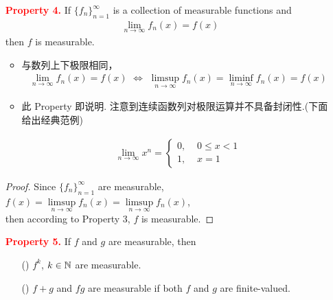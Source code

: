 \begin{enumerate}
		\newpage
		\item[\textcolor{red}{\textbf{Property 4.}}]If $\{ f_n \}_{n = 1}^{\infty}$ is a collection of measurable functions and
		\begin{align}
			\lim_{n \to \infty}{f_{n}(x)} = f(x)
		\end{align}
		then $f$ is measurable.
		
		\begin{rmk}
			\begin{itemize}
				\item 与数列上下极限相同，
				\begin{align}
					\lim_{n \to \infty}{f_{n}(x)} = f(x) \,\, \Leftrightarrow \,\, \limsup_{n \to \infty}{f_{n}(x)} = \liminf_{n \to \infty}{f_{n}(x)} = f(x)
				\end{align}
			
				\item 此 Property 即说明. 注意到连续函数列对极限运算并不具备封闭性.(下面给出经典范例)
				\begin{example}\label{ex 2.1.1}
					\begin{align}
						\lim_{n \to \infty}{x^n} = 
						\begin{cases}
							0 , \,\, &0 \leq x < 1 \\
							1 , &x = 1
						\end{cases}
					\end{align}
				\end{example}
			\end{itemize}
		\end{rmk}
	
		\vspace{2em}
		\begin{proof}
			Since $\{ f_n \}_{n = 1}^{\infty}$ are measurable, $f(x) = \underset{n \to \infty}{\limsup}{f_{n}(x)} = \underset{n \to \infty}{\limsup}{f_{n}(x)}$,\\
			then according to Property 3, $f$ is measurable.
		\end{proof}
	
		\vspace{2em}
		\item[\textcolor{red}{\textbf{Property 5.}}]If $f$ and $g$ are measurable, then
		\begin{enumerate}
			\item[(\rmnum{1})]$f^k$, $k \in \mathbb{N}$ are measurable.
			
			\item[(\rmnum{2})]$f + g$ and $fg$ are measurable if both $f$ and $g$ are finite-valued.
		\end{enumerate}
	

\end{enumerate}
